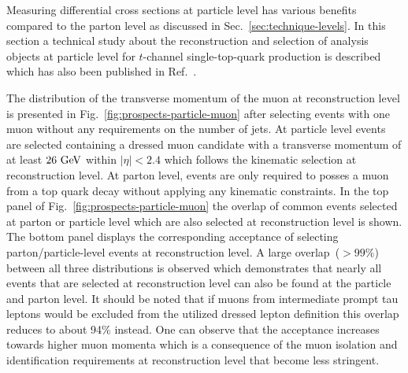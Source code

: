 Measuring differential cross sections at particle level has various benefits compared to the parton level as discussed in Sec.~\ref{sec:technique-levels}. In this section a technical study about the reconstruction and selection of analysis objects at particle level for $t$-channel single-top-quark production is described which has also been published in Ref.~\cite{particleStudies}.


The distribution of the transverse momentum of the muon at reconstruction level is presented in Fig.~\ref{fig:prospects-particle-muon} after selecting events with one muon without any requirements on the number of jets. At particle level events are selected containing a dressed muon candidate with a transverse momentum of at least $26~\textrm{GeV}$ within $|\eta|<2.4$ which follows the kinematic selection at reconstruction level. At parton level, events are only required to posses a muon from a top quark decay without applying any kinematic constraints. In the top panel of Fig.~\ref{fig:prospects-particle-muon} the overlap of common events selected at parton or particle level which are also selected at reconstruction level is shown. The bottom panel displays the corresponding acceptance of selecting parton/particle-level events at reconstruction level. A large overlap~($>99\%$) between all three distributions is observed which demonstrates that nearly all events that are selected at reconstruction level can also be found at the particle and parton level. It should be noted that if muons from intermediate prompt tau leptons would be excluded from the utilized dressed lepton definition this overlap reduces to about 94\% instead. One can observe that the acceptance increases towards higher muon momenta which is a consequence of the muon isolation and identification requirements at reconstruction level that become less stringent. 

